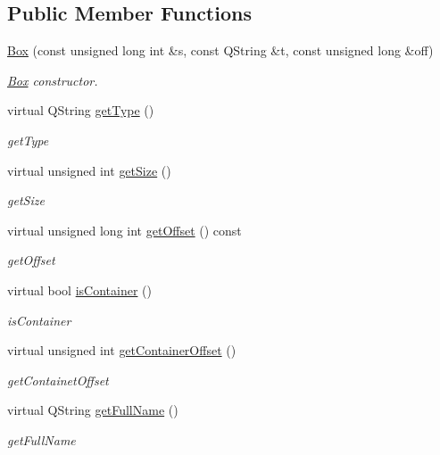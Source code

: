 \subsection*{Public Member Functions}
\begin{DoxyCompactItemize}
\item 
\hyperlink{class_box_a3bd17c5287bac521d03b5152212e40cc}{Box} (const unsigned long int \&s, const Q\-String \&t, const unsigned long \&off)
\begin{DoxyCompactList}\small\item\em \hyperlink{class_box}{Box} constructor. \end{DoxyCompactList}\item 
virtual Q\-String \hyperlink{class_box_ab349afe9881614148ca93db089ae3723}{get\-Type} ()
\begin{DoxyCompactList}\small\item\em get\-Type \end{DoxyCompactList}\item 
virtual unsigned int \hyperlink{class_box_ae7997ebd366dd92a4f0604bae393ea77}{get\-Size} ()
\begin{DoxyCompactList}\small\item\em get\-Size \end{DoxyCompactList}\item 
virtual unsigned long int \hyperlink{class_box_a3aa52ebe50e92cffe331215c829f0328}{get\-Offset} () const 
\begin{DoxyCompactList}\small\item\em get\-Offset \end{DoxyCompactList}\item 
virtual bool \hyperlink{class_box_aa836717b34b2a26f84b6933d143da42b}{is\-Container} ()
\begin{DoxyCompactList}\small\item\em is\-Container \end{DoxyCompactList}\item 
virtual unsigned int \hyperlink{class_box_a2c9deb5e813bff43a2b2b62aafafe5b6}{get\-Container\-Offset} ()
\begin{DoxyCompactList}\small\item\em get\-Containet\-Offset \end{DoxyCompactList}\item 
virtual Q\-String \hyperlink{class_box_aa7c1e41e425cce53e0bd532cfafbb67d}{get\-Full\-Name} ()
\begin{DoxyCompactList}\small\item\em get\-Full\-Name \end{DoxyCompactList}\item 

\end{DoxyCompactItemize}
